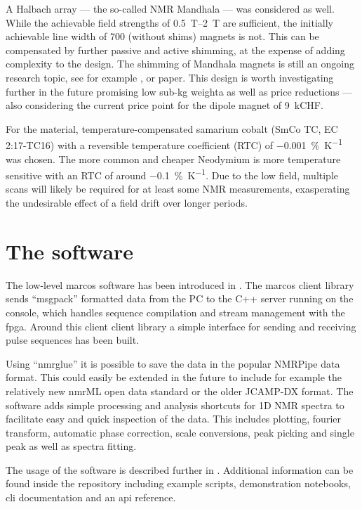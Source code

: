 A Halbach array --- the so-called NMR Mandhala --- was considered as well. While the achievable field strengths of \qtyrange{0.5}{2}{\tesla}  are sufficient, the initially achievable line width of \qty{700}{\partspermillion} \cite{raichDesignConstructionDipolar2004} (without shims) magnets is not. This can be compensated by further passive and active shimming, at the expense of adding complexity to the design. The shimming of Mandhala magnets is still an ongoing research topic, see for example ,  or  paper. This design is worth investigating further in the future promising low sub-kg weighta as well as price reductions --- also considering the current price point for the dipole magnet of \approx \qty{9}{kCHF}.

For the material, temperature-compensated samarium cobalt (SmCo TC, EC 2:17-TC16) with a reversible temperature coefficient (RTC) of \qty{-0.001}{\%\per\kelvin} was chosen. The more common and cheaper Neodymium is more temperature sensitive with an RTC of around \qty{-0.1}{\%\per\kelvin}. Due to the low field, multiple scans will likely be required for at least some NMR measurements, exasperating the undesirable effect of a field drift over longer periods.

\section{The software}
The low-level \gls{marcos} software has been introduced in . The \gls{marcos} client library sends \enquote{msgpack} formatted data from the PC to the C++ server running on the console, which handles sequence compilation and stream management with the \acrshort{fpga}. Around this client client library a simple interface for sending and receiving pulse sequences has been built.

Using \enquote{nmrglue}  it is possible to save the data in the popular NMRPipe  data format. This could easily be extended in the future to include for example the relatively new nmrML open data standard or the older JCAMP-DX  format. The software adds simple processing and analysis shortcuts for 1D NMR spectra to facilitate easy and quick inspection of the data. This includes plotting, fourier transform, automatic phase correction, scale conversions, peak picking and single peak as well as spectra fitting.

The usage of the software is described further in . Additional information can be found inside the repository including example scripts, demonstration notebooks, \acrshort{cli} documentation and an \acrshort{api} reference.

